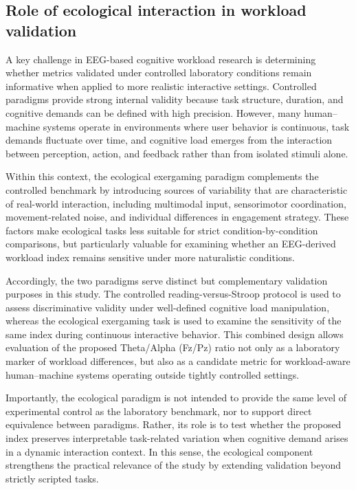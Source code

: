 \documentclass[10pt]{iopart}
\begin{document}
\subsection{Role of ecological interaction in workload validation}

A key challenge in EEG-based cognitive workload research is determining whether metrics validated under controlled laboratory conditions remain informative when applied to more realistic interactive settings. Controlled paradigms provide strong internal validity because task structure, duration, and cognitive demands can be defined with high precision. However, many human--machine systems operate in environments where user behavior is continuous, task demands fluctuate over time, and cognitive load emerges from the interaction between perception, action, and feedback rather than from isolated stimuli alone.

Within this context, the ecological exergaming paradigm complements the controlled benchmark by introducing sources of variability that are characteristic of real-world interaction, including multimodal input, sensorimotor coordination, movement-related noise, and individual differences in engagement strategy. These factors make ecological tasks less suitable for strict condition-by-condition comparisons, but particularly valuable for examining whether an EEG-derived workload index remains sensitive under more naturalistic conditions.

Accordingly, the two paradigms serve distinct but complementary validation purposes in this study. The controlled reading-versus-Stroop protocol is used to assess discriminative validity under well-defined cognitive load manipulation, whereas the ecological exergaming task is used to examine the sensitivity of the same index during continuous interactive behavior. This combined design allows evaluation of the proposed Theta/Alpha (Fz/Pz) ratio not only as a laboratory marker of workload differences, but also as a candidate metric for workload-aware human--machine systems operating outside tightly controlled settings.

Importantly, the ecological paradigm is not intended to provide the same level of experimental control as the laboratory benchmark, nor to support direct equivalence between paradigms. Rather, its role is to test whether the proposed index preserves interpretable task-related variation when cognitive demand arises in a dynamic interaction context. In this sense, the ecological component strengthens the practical relevance of the study by extending validation beyond strictly scripted tasks.
\end{document}
